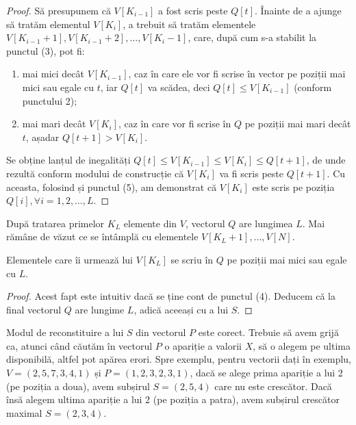 \begin{proof}
  Să presupunem că $V[K_{i-1}]$ a fost scris peste $Q[t]$. Înainte de a ajunge
  să tratăm elementul $V[K_i]$, a trebuit să tratăm elementele $V[K_{i-1}+1],
  V[K_{i-1}+2], \dots, V[K_{i}-1]$, care, după cum s-a stabilit la punctul
  (3), pot fi:

  \begin{enumerate}[label=\alph*)]

  \item mai mici decât $V[K_{i-1}]$, caz în care ele vor fi scrise în vector
    pe poziții mai mici sau egale cu $t$, iar $Q[t]$ va scădea, deci $Q[t]
    \leq V[K_{i-1}]$ (conform punctului 2);

  \item mai mari decât $V[K_i]$, caz în care vor fi scrise în $Q$ pe poziții
    mai mari decât $t$, așadar $Q[t+1]>V[K_i]$.
  \end{enumerate}

  Se obține lanțul de inegalități $Q[t] \leq V[K_{i-1}] \leq V[K_i] \leq
  Q[t+1]$, de unde rezultă conform modului de construcție că $V[K_i]$ va fi
  scris peste $Q[t+1]$. Cu aceasta, folosind și punctul (5), am demonstrat că
  $V[K_i]$ este scris pe poziția $Q[i], \forall i=1, 2, \dots, L$.

\end{proof}

După tratarea primelor $K_L$ elemente din $V$, vectorul $Q$ are lungimea
$L$. Mai rămâne de văzut ce se întâmplă cu elementele $V[K_L+1], \dots, V[N]$.

\begin{proposition}
  Elementele care îi urmează lui $V[K_L]$ se scriu în $Q$ pe poziții mai mici
  sau egale cu $L$.
\end{proposition}

\begin{proof}
  Acest fapt este intuitiv dacă se ține cont de punctul (4). Deducem că la
  final vectorul $Q$ are lungime $L$, adică aceeași cu a lui $S$.
\end{proof}

Modul de reconstituire a lui $S$ din vectorul $P$ este corect. Trebuie să avem
grijă ca, atunci când căutăm în vectorul $P$ o apariție a valorii $X$, să o
alegem pe ultima disponibilă, altfel pot apărea erori. Spre exemplu, pentru
vectorii dați în exemplu, $V=(2, 5, 7, 3, 4, 1)$ și $P=(1, 2, 3, 2, 3, 1)$,
dacă se alege prima apariție a lui 2 (pe poziția a doua), avem subșirul $S=(2,
5, 4)$ care nu este crescător. Dacă însă alegem ultima apariție a lui 2 (pe
poziția a patra), avem subșirul crescător maximal $S=(2, 3, 4)$.

